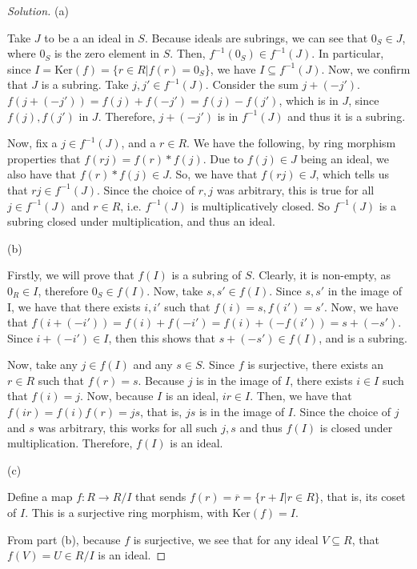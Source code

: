 \documentclass[10pt]{article}
\begin{document}
\begin{proof}[Solution]
(a)

Take $J$ to be a an ideal in $S$. Because ideals are subrings, we can see that $0_S \in J$, where $0_S$ is the zero element in $S$. Then, $f^{-1}(0_S) \in f^{-1}(J)$. In particular, since $I = \text{Ker}(f) = \{ r \in R | f(r) = 0_S\}$, we have $I \subseteq  f^{-1}(J)$. Now, we confirm that $J$ is a subring. Take $j,j' \in f^{-1}(J)$. Consider the sum $j + (-j')$. $f(j + (-j')) = f(j) + f(-j') = f(j) - f(j')$, which is in $J$, since $f(j), f(j')$ in $J$. Therefore, $j + (-j')$ is in $f^{-1}(J)$ and thus it is a subring.

Now, fix a $j \in f^{-1}(J)$, and a $r \in R$. We have the following, by ring morphism properties that $ f(rj) = f(r)*f(j)$. Due to $f(j) \in J$ being an ideal, we also have that $f(r) * f(j) \in J$. So, we have that $f(rj) \in J$, which tells us that $rj \in  f^{-1}(J)$. Since the choice of $r,j$ was arbitrary, this is true for all $j \in f^{-1}(J)$ and $r \in R$, i.e. $f^{-1}(J)$ is multiplicatively closed. So $f^{-1}(J)$ is a subring closed under multiplication, and thus an ideal.

(b)

Firstly, we will prove that $f(I)$ is a subring of $S$. Clearly, it is non-empty, as $0_R \in I$, therefore $0_S \in f(I)$. Now, take $s,s' \in f(I)$. Since $s,s'$ in the image of I, we have that there exists $i,i'$ such that $f(i) = s, f(i') = s'$. Now, we have that $f(i + (-i')) = f(i) + f(-i') = f(i)  + (- f(i')) = s + (-s')$. Since $i + (-i') \in I$, then this shows that $s + (-s') \in f(I)$, and is a subring.

Now, take any $j \in f(I)$ and any $s \in S$. Since $f$ is surjective, there exists an $r \in R$ such that $f(r) = s$. Because $j$ is in the image of $I$, there exists $i \in I$ such that $f(i) = j$. Now, because $I$ is an ideal, $ir \in I$. Then, we have that $f(ir) = f(i)f(r) = js$, that is, $js$ is in the image of $I$. Since the choice of $j$ and $s$ was arbitrary, this works for all such $j,s$ and thus $f(I)$ is closed under multiplication. Therefore, $f(I)$ is an ideal.

(c)

Define a map $f: R \rightarrow R/I$ that sends $f(r) = \overline{r} = \{ r + I | r \in R \}$, that is, its coset of $I$. This is a surjective ring morphism, with $\text{Ker}(f) = I$. 

From part (b), because $f$ is surjective, we see that for any ideal $V \subseteq R$, that $f(V) = U \in R/I$ is an ideal. 


\end{proof}
\end{document}
